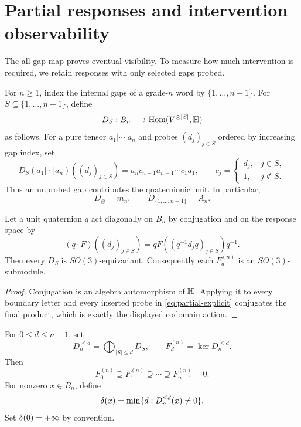 \section{Partial responses and intervention observability}\label{sec:partial}

The all-gap map proves eventual visibility.  To measure how much intervention is required, we retain responses with only selected gaps probed.

For $n\ge1$, index the internal gaps of a grade-$n$ word by $\{1,\ldots,n-1\}$.  For
$S\subseteq\{1,\ldots,n-1\}$, define
\[
  D_S:B_n\longrightarrow\operatorname{Hom}(V^{\otimes|S|},\mathbb H)
\]
as follows.  For a pure tensor $a_1|\cdots|a_n$ and probes $(d_j)_{j\in S}$ ordered by increasing gap index, set
\begin{equation}\label{eq:partial-explicit}
  D_S(a_1|\cdots|a_n)((d_j)_{j\in S})
  =a_n c_{n-1}a_{n-1}\cdots c_1a_1,
  \qquad
  c_j=\begin{cases}d_j,&j\in S,\\1,&j\notin S.\end{cases}
\end{equation}
Thus an unprobed gap contributes the quaternionic unit.  In particular,
\[
  D_\varnothing=m_n,
  \qquad
  D_{\{1,\ldots,n-1\}}=A_n.
\]

\begin{lemma}\label{lem:partial-equivariance}
Let a unit quaternion $q$ act diagonally on $B_n$ by conjugation and on the response space by
\[
  (q\cdot F)((d_j)_{j\in S})
  =qF((q^{-1}d_jq)_{j\in S})q^{-1}.
\]
Then every $D_S$ is $SO(3)$-equivariant.  Consequently each $F_d^{(n)}$ is an $SO(3)$-submodule.
\end{lemma}

\begin{proof}
Conjugation is an algebra automorphism of $\mathbb H$.  Applying it to every boundary letter and every inserted probe in \eqref{eq:partial-explicit} conjugates the final product, which is exactly the displayed codomain action.
\end{proof}

\begin{definition}
For $0\le d\le n-1$, set
\begin{equation}\label{eq:depth-filtration}
  D_n^{\le d}=\bigoplus_{|S|\le d}D_S,
  \qquad
  F_d^{(n)}=\ker D_n^{\le d}.
\end{equation}
Then
\[
  F_0^{(n)}\supseteq F_1^{(n)}\supseteq\cdots\supseteq F_{n-1}^{(n)}=0.
\]
For nonzero $x\in B_n$, define
\begin{equation}\label{eq:first-depth}
  \delta(x)=\min\{d:D_n^{\le d}(x)\ne0\}.
\end{equation}
Set $\delta(0)=+\infty$ by convention.
\end{definition}


